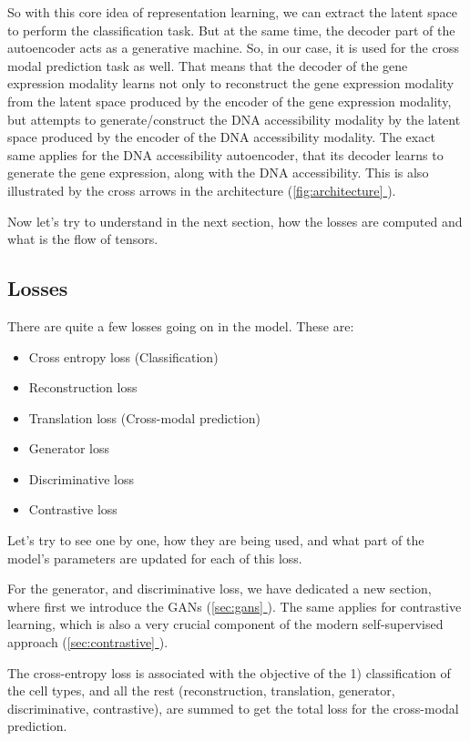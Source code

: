 \documentclass[12pt, a4paper]{article}
\newcommand*{\fullref}[1]{\hyperref[{#1}]{\ref*{#1} \nameref*{#1}}}
\begin{document}
So with this core idea of representation learning, we can extract the latent space to perform the classification task. But at the same time, the decoder part of the autoencoder acts as a generative machine. So, in our case, it is used for the cross modal prediction task as well. That means that the decoder of the gene expression modality learns not only to reconstruct the gene expression modality from the latent space produced by the encoder of the gene expression modality, but attempts to generate/construct the DNA accessibility modality by the latent space produced by the encoder of the DNA accessibility modality. The exact same applies for the DNA accessibility autoencoder, that its decoder learns to generate the gene expression, along with the DNA accessibility. This is also illustrated by the cross arrows in the architecture (\fullref{fig:architecture}).

Now let's try to understand in the next section, how the losses are computed and what is the flow of tensors.

\clearpage

\subsection{Losses}
\label{sec:losses}

There are quite a few losses going on in the model. These are: 

\begin{itemize}
  \itemsep -0.1em
  \item Cross entropy loss (Classification)  
  \item Reconstruction loss
  \item Translation loss (Cross-modal prediction)
  \item Generator loss
  \item Discriminative loss
  \item Contrastive loss
\end{itemize}

Let's try to see one by one, how they are being used, and what part of the model's parameters are updated for each of this loss.

For the generator, and discriminative loss, we have dedicated a new section, where first we introduce the GANs (\fullref{sec:gans}). The same applies for contrastive learning, which is also a very crucial component of the modern self-supervised approach (\fullref{sec:contrastive}).

The cross-entropy loss is associated with the objective of the 1) classification of the cell types, and all the rest (reconstruction, translation, generator, discriminative, contrastive), are summed to get the total loss for the cross-modal prediction.
\end{document}
